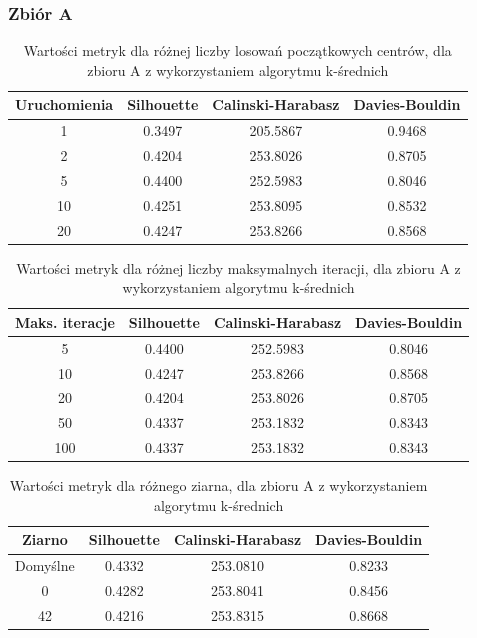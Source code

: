\documentclass[a4paper,11pt]{article}
\begin{document}
\subsubsection*{Zbiór A}

\begin{table}[!hp]
    \centering
    \begin{tabular}{|c|c|c|c|}
    \hline
    \textbf{Uruchomienia} & \textbf{Silhouette} & \textbf{Calinski-Harabasz} & \textbf{Davies-Bouldin} \\ \hline
    1  & 0.3497 & 205.5867 & 0.9468 \\ \hline
    2  & 0.4204 & 253.8026 & 0.8705 \\ \hline
    5  & 0.4400 & 252.5983 & 0.8046 \\ \hline
    10 & 0.4251 & 253.8095 & 0.8532 \\ \hline
    20 & 0.4247 & 253.8266 & 0.8568 \\ \hline
    \end{tabular}
    \caption{Wartości metryk dla różnej liczby losowań początkowych centrów, dla zbioru A z wykorzystaniem algorytmu k-średnich}
    \label{tab:km_a_1}
\end{table}

\begin{table}[H]
    \centering
    \begin{tabular}{|c|c|c|c|}
    \hline
    \textbf{Maks. iteracje} & \textbf{Silhouette} & \textbf{Calinski-Harabasz} & \textbf{Davies-Bouldin} \\ \hline
    5   & 0.4400 & 252.5983 & 0.8046 \\ \hline
    10  & 0.4247 & 253.8266 & 0.8568 \\ \hline
    20  & 0.4204 & 253.8026 & 0.8705 \\ \hline
    50  & 0.4337 & 253.1832 & 0.8343 \\ \hline
    100 & 0.4337 & 253.1832 & 0.8343 \\ \hline
    \end{tabular}
    \caption{Wartości metryk dla różnej liczby maksymalnych iteracji, dla zbioru A z wykorzystaniem algorytmu k-średnich}
    \label{tab:km_a_2}
\end{table}

\begin{table}[H]
    \centering
    \begin{tabular}{|c|c|c|c|}
    \hline
    \textbf{Ziarno} & \textbf{Silhouette} & \textbf{Calinski-Harabasz} & \textbf{Davies-Bouldin} \\ \hline
    Domyślne & 0.4332 & 253.0810 & 0.8233 \\ \hline
    0        & 0.4282 & 253.8041 & 0.8456 \\ \hline
    42       & 0.4216 & 253.8315 & 0.8668 \\ \hline
    \end{tabular}
    \caption{Wartości metryk dla różnego ziarna, dla zbioru A z wykorzystaniem algorytmu k-średnich}
    \label{tab:km_a_3}
\end{table}
\end{document}
